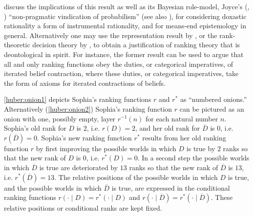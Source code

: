 \citet{beh} discuss the implications of this result as well as its Bayesian role-model, Joyce's (, ) ``non-pragmatic vindication of probabilism'' (see also \citealt{p11,p13}), for considering doxastic rationality a form of instrumental rationality, and for means-end epistemology in general. Alternatively one may use the representation result by \citet{hs08}, or the rank-theoretic decision theory by \citet{gs00}, to obtain a justification of ranking theory that is deontological in spirit. For instance, the former result can be used to argue that all and only ranking functions obey the duties, or categorical imperatives, of iterated belief contraction, where these duties, or categorical imperatives, take the form of axioms for iterated contractions of beliefs.

\autoref{huber:onion1} depicts Sophia's ranking functions $r$ and $r^*$ as ``numbered onions.'' Alternatively (\autoref{huber:onion2}) Sophia's ranking function $r$ can be pictured as an onion with one, possibly empty, layer $r^{-1}\left(n\right)$ for each natural number $n$. Sophia's old rank for $D$ is $2$, i.e. $r(D)=2$, and her old rank for $\overline{D}$ is $0$, i.e. $r(\overline{D})=0$. Sophia's new ranking function $r^*$ results from her old ranking function $r$ by first improving the possible worlds in which $D$ is true by $2$ ranks so that the new rank of $D$ is $0$, i.e. $r^*\left(D\right)=0$. In a second step the possible worlds in which $\overline{D}$ is true are deteriorated by $13$ ranks so that the new rank of $\overline{D}$ is $13$, i.e. $r^*(\overline{D})=13$. The relative positions of the possible worlds in which $D$ is true, and the possible worlds in which $\overline{D}$ is true, are expressed in the conditional ranking functions $r(\cdot\mid D)=r^*(\cdot\mid D)$ and $r(\cdot\mid\overline{D})=r^*(\cdot\mid\overline{D})$. These relative positions or conditional ranks are kept fixed.

